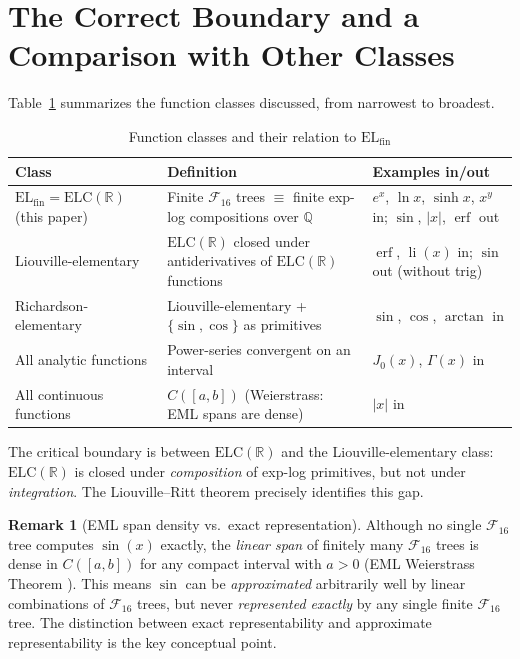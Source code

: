 \documentclass[12pt,a4paper]{article}
\theoremstyle{definition}
\newtheorem{remark}[theorem]{Remark}
\newcommand{\F}{\mathcal{F}_{16}}
\newcommand{\ELfin}{\mathrm{EL}_{\mathrm{fin}}}
\newcommand{\ELC}{\mathrm{ELC}(\mathbb{R})}
\newcommand{\Q}{\mathbb{Q}}
\begin{document}
\section{The Correct Boundary and a Comparison with Other Classes}
\label{sec:boundary}

Table~\ref{tab:classes} summarizes the function classes discussed, from
narrowest to broadest.

\begin{table}[h]
\centering
\caption{Function classes and their relation to $\ELfin$}
\label{tab:classes}
\begin{tabular}{@{}p{3.8cm}p{6.5cm}p{3.5cm}@{}}
\toprule
Class & Definition & Examples in/out \\
\midrule
$\ELfin = \ELC$ (this paper) &
Finite $\F$ trees $\equiv$ finite exp-log compositions over $\Q$ &
$e^x$, $\ln x$, $\sinh x$, $x^y$ in; $\sin$, $|x|$, $\operatorname{erf}$ out \\[4pt]
Liouville-elementary &
$\ELC$ closed under antiderivatives of $\ELC$ functions &
$\operatorname{erf}$, $\operatorname{li}(x)$ in; $\sin$ out (without trig) \\[4pt]
Richardson-elementary &
Liouville-elementary + $\{\sin,\cos\}$ as primitives &
$\sin$, $\cos$, $\arctan$ in \\[4pt]
All analytic functions &
Power-series convergent on an interval &
$J_0(x)$, $\Gamma(x)$ in \\[4pt]
All continuous functions &
$C([a,b])$ (Weierstrass: EML spans are dense) &
$|x|$ in \\
\bottomrule
\end{tabular}
\end{table}

The critical boundary is between $\ELC$ and the Liouville-elementary class:
$\ELC$ is closed under \emph{composition} of exp-log primitives, but not under
\emph{integration}.  The Liouville--Ritt theorem precisely identifies this gap.

\begin{remark}[EML span density vs.\ exact representation]
Although no single $\F$ tree computes $\sin(x)$ exactly, the \emph{linear span}
of finitely many $\F$ trees is dense in $C([a,b])$ for any compact interval
with $a>0$ (EML Weierstrass Theorem \cite{EMLWeierstrass}).  This means $\sin$
can be \emph{approximated} arbitrarily well by linear combinations of $\F$ trees,
but never \emph{represented exactly} by any single finite $\F$ tree.  The
distinction between exact representability and approximate representability is
the key conceptual point.
\end{remark}
\end{document}
